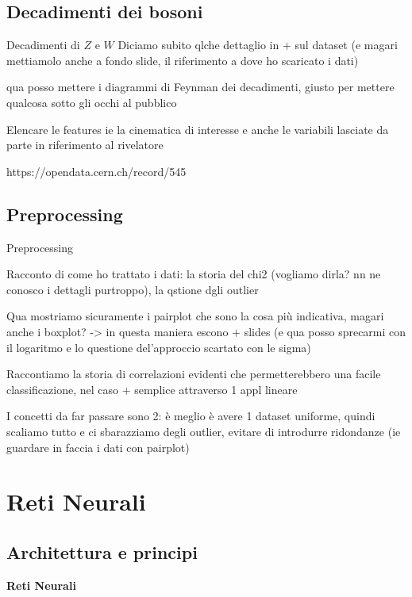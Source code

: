 \documentclass{beamer}
\begin{document}
\subsection{Decadimenti dei bosoni}
\begin{frame}{Decadimenti di $Z$ e $W$}
  Diciamo subito qlche dettaglio in $+$ sul dataset (e magari mettiamolo anche a fondo slide, il riferimento a dove ho scaricato i dati)

  qua posso mettere i diagrammi di Feynman dei decadimenti, giusto per mettere qualcosa sotto gli occhi al pubblico

  Elencare le features ie la cinematica di interesse e anche le variabili lasciate da parte in riferimento al rivelatore

  \begin{flushright}
    \scriptsize
    https://opendata.cern.ch/record/545
  \end{flushright}
\end{frame}

\subsection{Preprocessing}
\begin{frame}{Preprocessing}

  {\scriptsize
  Racconto di come ho trattato i dati: la storia del chi2 (vogliamo dirla? nn ne conosco i dettagli purtroppo), la qstione dgli outlier

  Qua mostriamo sicuramente i pairplot che sono la cosa più indicativa, magari anche i boxplot? -> in questa maniera escono $+$ slides (e qua posso sprecarmi con il logaritmo e lo questione del'approccio scartato con le sigma)
  
  Raccontiamo la storia di correlazioni evidenti che permetterebbero una facile classificazione, nel caso $+$ semplice attraverso 1 appl lineare

  I concetti da far passare sono 2: è meglio è avere 1 dataset uniforme, quindi scaliamo tutto e ci sbarazziamo degli outlier, evitare di introdurre ridondanze (ie guardare in faccia i dati con pairplot)
  }
\end{frame}

\section{Reti Neurali}
\subsection{Architettura e principi}
\begin{frame}
  \centering
  \Huge\bfseries
  Reti Neurali
\end{frame}
\end{document}
